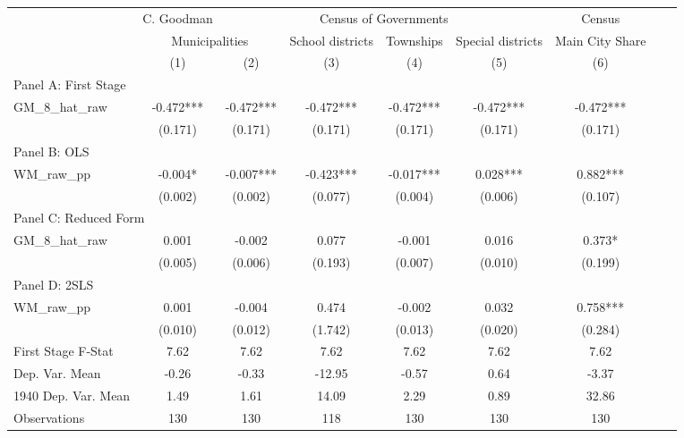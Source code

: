  \begin{tabular}{l*{8}{c}} \toprule
&\multicolumn{1}{c}{C. Goodman}&\multicolumn{4}{c}{Census of Governments}&\multicolumn{1}{c}{Census}\\\cmidrule(lr){2-2}\cmidrule(lr){3-6}\cmidrule(lr){7-7}
&\multicolumn{2}{c}{Municipalities}&\multicolumn{1}{c}{School districts}&\multicolumn{1}{c}{Townships}&\multicolumn{1}{c}{Special districts}&\multicolumn{1}{c}{Main City Share}\\\cmidrule(lr){2-3}\cmidrule(lr){4-6}\cmidrule(lr){7-7}
&\multicolumn{1}{c}{(1)}&\multicolumn{1}{c}{(2)}&\multicolumn{1}{c}{(3)}&\multicolumn{1}{c}{(4)}&\multicolumn{1}{c}{(5)}&\multicolumn{1}{c}{(6)}\\
\cmidrule(lr){1-7}
\multicolumn{6}{l}{Panel A: First Stage}\\
\cmidrule(lr){1-7}
GM\_8\_hat\_raw    &   -0.472***&   -0.472***&   -0.472***&   -0.472***&   -0.472***&   -0.472***\\
                &  (0.171)   &  (0.171)   &  (0.171)   &  (0.171)   &  (0.171)   &  (0.171)   \\
\cmidrule(lr){1-7}
\multicolumn{6}{l}{Panel B: OLS}\\
\cmidrule(lr){1-7}
WM\_raw\_pp       &   -0.004*  &   -0.007***&   -0.423***&   -0.017***&    0.028***&    0.882***\\
                &  (0.002)   &  (0.002)   &  (0.077)   &  (0.004)   &  (0.006)   &  (0.107)   \\
\cmidrule(lr){1-7}
\multicolumn{6}{l}{Panel C: Reduced Form}\\
\cmidrule(lr){1-7}
GM\_8\_hat\_raw    &    0.001   &   -0.002   &    0.077   &   -0.001   &    0.016   &    0.373*  \\
                &  (0.005)   &  (0.006)   &  (0.193)   &  (0.007)   &  (0.010)   &  (0.199)   \\
\cmidrule(lr){1-7}
\multicolumn{6}{l}{Panel D: 2SLS}\\
\cmidrule(lr){1-7}
WM\_raw\_pp       &    0.001   &   -0.004   &    0.474   &   -0.002   &    0.032   &    0.758***\\
                &  (0.010)   &  (0.012)   &  (1.742)   &  (0.013)   &  (0.020)   &  (0.284)   \\
\midrule
First Stage F-Stat&     7.62   &     7.62   &     7.62   &     7.62   &     7.62   &     7.62   \\
Dep. Var. Mean  &    -0.26   &    -0.33   &   -12.95   &    -0.57   &     0.64   &    -3.37   \\
1940 Dep. Var. Mean&     1.49   &     1.61   &    14.09   &     2.29   &     0.89   &    32.86   \\
Observations    &      130   &      130   &      118   &      130   &      130   &      130   \\
 \bottomrule \end{tabular}
